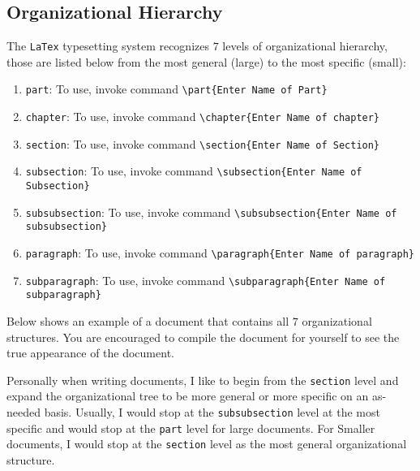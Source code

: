 \documentclass[a4paper, 12pt]{report}
\begin{document}
\begin{center}
\subsection{Organizational Hierarchy}
\begin{comment}
\end{comment}
The \texttt{LaTex} typesetting system recognizes $7$ levels of organizational hierarchy, those are listed below from the most general (large) to the most specific (small):
\begin{enumerate}
\item \texttt{part}: To use, invoke command \texttt{\textbackslash part\{Enter Name of Part\}} 
\item \texttt{chapter}: To use, invoke command \texttt{\textbackslash chapter\{Enter Name of chapter\}} 
\item \texttt{section}: To use, invoke command \texttt{\textbackslash section\{Enter Name of Section\}} 
\item \texttt{subsection}: To use, invoke command \texttt{\textbackslash subsection\{Enter Name of Subsection\}} 
\item \texttt{subsubsection}: To use, invoke command \texttt{\textbackslash subsubsection\{Enter Name of subsubsection\}}
\item \texttt{paragraph}: To use, invoke command \texttt{\textbackslash paragraph\{Enter Name of paragraph\}}
\item \texttt{subparagraph}: To use, invoke command \texttt{\textbackslash subparagraph\{Enter Name of subparagraph\}}
\end{enumerate}
Below shows an example of a document that contains all $7$ organizational structures. You are encouraged to compile the document for yourself to see the true appearance of the document.

Personally when writing documents, I like to begin from the \texttt{section} level and expand the organizational tree to be more general or more specific on an as-needed basis. Usually, I would stop at the \texttt{subsubsection} level at the most specific and would stop at the \texttt{part} level for large documents. For Smaller documents, I would stop at the \texttt{section} level as the most general organizational structure.


\end{center}
\end{document}
